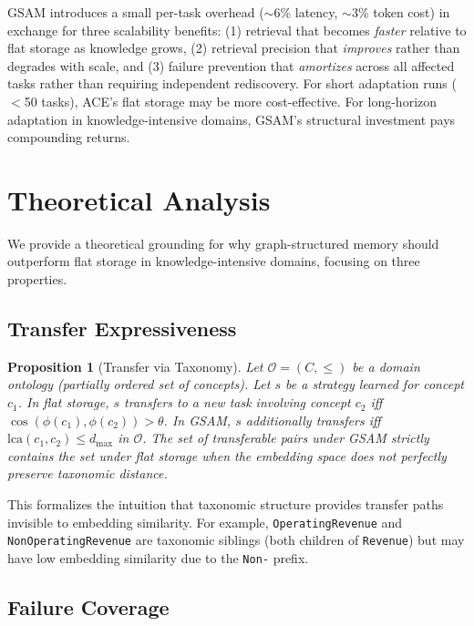 \documentclass[12pt,a4paper]{article}
\newtheorem{proposition}{Proposition}
\begin{document}
GSAM introduces a small per-task overhead ($\sim$6\% latency, $\sim$3\% token cost) in exchange for three scalability benefits: (1) retrieval that becomes \textit{faster} relative to flat storage as knowledge grows, (2) retrieval precision that \textit{improves} rather than degrades with scale, and (3) failure prevention that \textit{amortizes} across all affected tasks rather than requiring independent rediscovery. For short adaptation runs ($<$50 tasks), ACE's flat storage may be more cost-effective. For long-horizon adaptation in knowledge-intensive domains, GSAM's structural investment pays compounding returns.


\section{Theoretical Analysis}
\label{sec:theory}

We provide a theoretical grounding for why graph-structured memory should outperform flat storage in knowledge-intensive domains, focusing on three properties.

\subsection{Transfer Expressiveness}

\begin{proposition}[Transfer via Taxonomy]
Let $\mathcal{O} = (C, \leq)$ be a domain ontology (partially ordered set of concepts). Let $s$ be a strategy learned for concept $c_1$. In flat storage, $s$ transfers to a new task involving concept $c_2$ iff $\cos(\phi(c_1), \phi(c_2)) > \theta$. In GSAM, $s$ additionally transfers iff $\text{lca}(c_1, c_2) \leq d_{\max}$ in $\mathcal{O}$. The set of transferable pairs under GSAM strictly contains the set under flat storage when the embedding space does not perfectly preserve taxonomic distance.
\end{proposition}

This formalizes the intuition that taxonomic structure provides transfer paths invisible to embedding similarity. For example, \texttt{OperatingRevenue} and \texttt{NonOperatingRevenue} are taxonomic siblings (both children of \texttt{Revenue}) but may have low embedding similarity due to the \texttt{Non-} prefix.

\subsection{Failure Coverage}
\end{document}
